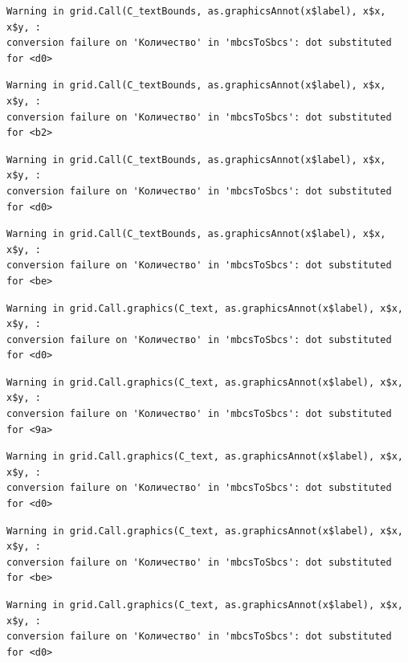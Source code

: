 \documentclass[
  letterpaper,
  DIV=11,
  numbers=noendperiod]{scrreprt}
\theoremstyle{definition}
\theoremstyle{remark}
\begin{document}
\begin{verbatim}
Warning in grid.Call(C_textBounds, as.graphicsAnnot(x$label), x$x, x$y, :
conversion failure on 'Количество' in 'mbcsToSbcs': dot substituted for <d0>
\end{verbatim}

\begin{verbatim}
Warning in grid.Call(C_textBounds, as.graphicsAnnot(x$label), x$x, x$y, :
conversion failure on 'Количество' in 'mbcsToSbcs': dot substituted for <b2>
\end{verbatim}

\begin{verbatim}
Warning in grid.Call(C_textBounds, as.graphicsAnnot(x$label), x$x, x$y, :
conversion failure on 'Количество' in 'mbcsToSbcs': dot substituted for <d0>
\end{verbatim}

\begin{verbatim}
Warning in grid.Call(C_textBounds, as.graphicsAnnot(x$label), x$x, x$y, :
conversion failure on 'Количество' in 'mbcsToSbcs': dot substituted for <be>
\end{verbatim}

\begin{verbatim}
Warning in grid.Call.graphics(C_text, as.graphicsAnnot(x$label), x$x, x$y, :
conversion failure on 'Количество' in 'mbcsToSbcs': dot substituted for <d0>
\end{verbatim}

\begin{verbatim}
Warning in grid.Call.graphics(C_text, as.graphicsAnnot(x$label), x$x, x$y, :
conversion failure on 'Количество' in 'mbcsToSbcs': dot substituted for <9a>
\end{verbatim}

\begin{verbatim}
Warning in grid.Call.graphics(C_text, as.graphicsAnnot(x$label), x$x, x$y, :
conversion failure on 'Количество' in 'mbcsToSbcs': dot substituted for <d0>
\end{verbatim}

\begin{verbatim}
Warning in grid.Call.graphics(C_text, as.graphicsAnnot(x$label), x$x, x$y, :
conversion failure on 'Количество' in 'mbcsToSbcs': dot substituted for <be>
\end{verbatim}

\begin{verbatim}
Warning in grid.Call.graphics(C_text, as.graphicsAnnot(x$label), x$x, x$y, :
conversion failure on 'Количество' in 'mbcsToSbcs': dot substituted for <d0>
\end{verbatim}
\end{document}
